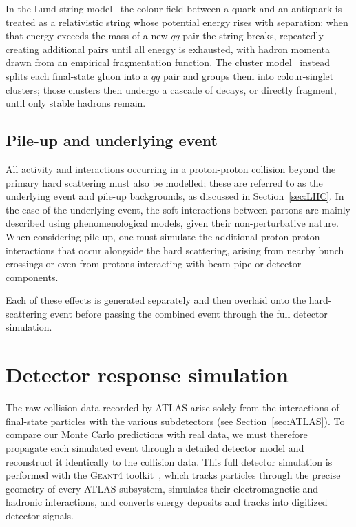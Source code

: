 In the Lund string model~\cite{ANDERSSON198331} the colour field between a quark and an antiquark is treated as a relativistic string whose potential energy rises with separation; when that energy exceeds the mass of a new $q\bar{q}$ pair the string breaks, repeatedly creating additional pairs until all energy is exhausted, with hadron momenta drawn from an empirical fragmentation function. 
The cluster model~\cite{Winter_2004} instead splits each final-state gluon into a $q\bar{q}$ pair and groups them into colour-singlet clusters; those clusters then undergo a cascade of decays, or directly fragment, until only stable hadrons remain.

\subsection*{Pile-up and underlying event}
\label{subsec:Pile}

All activity and interactions occurring in a proton-proton collision beyond the primary hard scattering must also be modelled; these are referred to as the underlying event and pile-up backgrounds, as discussed in Section~\ref{sec:LHC}. 
In the case of the underlying event, the soft interactions between partons are mainly described using phenomenological models, given their non-perturbative nature. When considering pile-up, one must simulate the additional proton-proton interactions that occur alongside the hard scattering, arising from nearby bunch crossings or even from protons interacting with beam-pipe or detector components.

Each of these effects is generated separately and then overlaid onto the hard-scattering event before passing the combined event through the full detector simulation.



\section{Detector response simulation}
\label{sec:Detector}

The raw collision data recorded by ATLAS arise solely from the interactions of final-state particles with the various subdetectors (see Section~\ref{sec:ATLAS}). To compare our Monte Carlo predictions with real data, we must therefore propagate each simulated event through a detailed detector model and reconstruct it identically to the collision data.  This full detector simulation is performed with the \textsc{Geant4} toolkit~\cite{AGOSTINELLI2003250}, which tracks particles through the precise geometry of every ATLAS subsystem, simulates their electromagnetic and hadronic interactions, and converts energy deposits and tracks into digitized detector signals.

